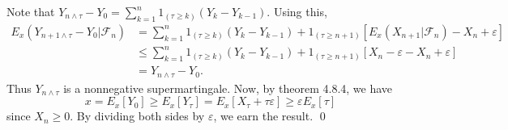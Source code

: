 \begin{problem}[5.5.9] \hfill
	
	Note that $Y_{n\wedge \tau} - Y_0 = \sum_{k=1}^n 1_{\left( \tau \ge k \right)}\left( Y_k - Y_{k-1} \right).$
	Using this,
	\[
		\begin{split}
			E_x\left( Y_{n+1 \wedge \tau} - Y_0 \lvert \mathcal{F}_n \right)
			&= \sum_{k=1}^n 1_{\left( \tau \ge k \right)}\left( Y_k - Y_{k-1} \right)
		+ 1_{\left( \tau \ge n+1 \right)}\left [E_x\left( X_{n+1} \lvert \mathcal{F}_n \right) - X_n +\varepsilon \right ]\\
		&\le \sum_{k=1}^n 1_{\left( \tau \ge k \right)}\left( Y_k - Y_{k-1} \right) + 1_{\left( \tau \ge n+1 \right)}\left[ X_n - \varepsilon - X_n + \varepsilon \right] \\
		&= Y_{n\wedge \tau}-Y_0.
		\end{split}
	\]
	Thus $Y_{n\wedge \tau}$ is a nonnegative supermartingale.
	Now, by theorem 4.8.4, we have
	\[
		x = E_x[Y_0] \ge E_x[Y_\tau] = E_x[X_\tau + \tau \varepsilon] \ge \varepsilon E_x[\tau]
	\]
	since $X_n \ge 0$.
	By dividing both sides by $\varepsilon$, we earn the result.
	\qed
\end{problem}
